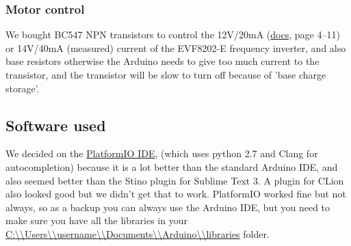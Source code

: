 \subsubsection{Motor control}
We bought BC547 NPN transistors to control the 12V/20mA (\href{http://download.lenze.com/TD/8201-8204__Inverter__v02-08__EN.pdf }{docs}, page 4--11) or 14V/40mA (measured) current of the EVF8202-E frequency inverter, and also base resistors otherwise the Arduino needs to give too much current to the transistor, and the transistor will be slow to turn off because of 'base charge storage'.
\subsection{Software used}\label{subsec:softwareUsed}
We decided on the \href{http://platformio.org/platformio-ide}{PlatformIO IDE}, (which uses python 2.7 and Clang for autocompletion) because it is a lot better than the standard Arduino IDE, and also seemed better than the Stino plugin for Sublime Text 3.
A plugin for CLion also looked good but we didn't get that to work.
PlatformIO worked fine but not always, so as a backup you can always use the Arduino IDE, but you need to make sure you have all the libraries in your \url{C:\\Users\\username\\Documents\\Arduino\\libraries} folder.